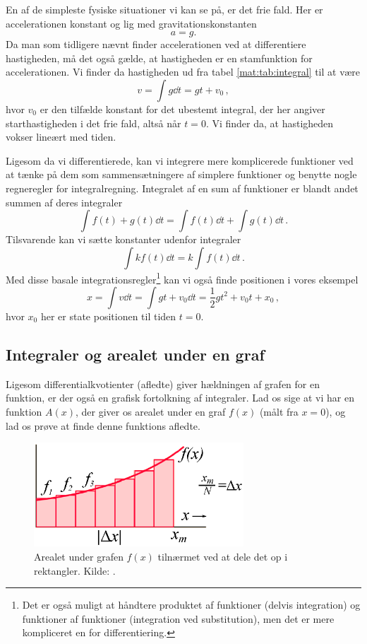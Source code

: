 En af de simpleste fysiske situationer vi kan se på, er det frie fald.
Her er accelerationen konstant og lig med gravitationskonstanten
$$
a=g.
$$
Da man som tidligere nævnt finder accelerationen ved at differentiere hastigheden, må det også gælde, at hastigheden er en stamfunktion for accelerationen. Vi finder da hastigheden ud fra tabel \ref{mat:tab:integral} til at være
$$
v=\int g\dd{t}=gt+v_0 \, ,
$$
hvor $v_0$ er den tilfælde konstant for det ubestemt integral, der her angiver starthastigheden i det frie fald, altså når $t=0$. Vi finder da, at hastigheden vokser lineært med tiden.

Ligesom da vi differentierede, kan vi integrere mere komplicerede funktioner ved at tænke på dem som sammensætningere af simplere funktioner og benytte nogle regneregler for integralregning.
Integralet af en sum af funktioner er blandt andet summen af deres integraler
\begin{equation}
\int f(t)+g(t)\dd{t}=\int f(t)\dd{t}+\int g(t)\dd{t} \, .
\end{equation}
Tilsvarende kan vi sætte konstanter udenfor integraler
\begin{equation} \label{mat:eq:konstant}
\int kf(t)\dd{t}=k\int f(t)\dd{t} \, .
\end{equation}
Med disse basale integrationsregler\footnote{Det er også muligt at håndtere produktet af funktioner (delvis integration) og funktioner af funktioner (integration ved substitution), men det er mere kompliceret en for differentiering.} kan vi også finde positionen i vores eksempel
$$
x=\int v\dd{t}=\int gt+v_0\dd{t}=\frac{1}{2}gt^2+v_0t+x_0 \, ,
$$
hvor $x_0$ her er state positionen til tiden $t=0$.

\subsection{Integraler og arealet under en graf}

Ligesom differentialkvotienter (afledte) giver hældningen af grafen for en funktion, er der også en grafisk fortolkning af integraler.
Lad os sige at vi har en funktion $A(x)$, der giver os arealet under en graf $f(x)$ (målt fra $x=0$), og lad os prøve at finde denne funktions afledte.
\begin{figure}[h]
    \centering
    \includegraphics[width = 0.7\textwidth]{Mat/matfig/integral.eps}
    \caption{Arealet under grafen $f(x)$ tilnærmet ved at dele det op i rektangler. Kilde: \cite{Integral}.}
    \label{mat:fig:integralapprox}
\end{figure}

